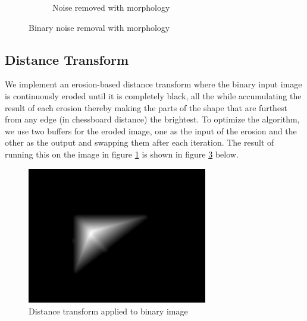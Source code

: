 \documentclass[]{article}
\begin{document}
\begin{figure}[H]
\begin{subfigure}{0.5\textwidth}
        \caption{Noise removed with morphology}
        \label{fig:bin_after}
    \end{subfigure}%
    \caption{Binary noise removal with morphology}
    \label{fig:binary_morph}
\end{figure}

\subsection{Distance Transform}
We implement an erosion-based distance transform where the binary input image is continuously eroded until it is completely black, all the while accumulating the result of each erosion thereby making the parts of the shape that are furthest from any edge (in chessboard distance) the brightest. To optimize the algorithm, we use two buffers for the eroded image, one as the input of the erosion and the other as the output and swapping them after each iteration. The result of running this on the image in figure \ref{fig:bin_after} is shown in figure \ref{fig:dist_transform} below.
\begin{figure}[H]
\centering
\includegraphics[width=0.7\textwidth]{img/noisy-distance}
\caption{Distance transform applied to binary image}
\label{fig:dist_transform}
\end{figure}
\end{document}
